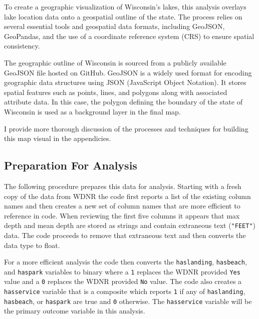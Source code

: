 \documentclass[
]{article}
\begin{document}
\begin{tcolorbox}[enhanced jigsaw, coltitle=black, toprule=.15mm, arc=.35mm, bottomtitle=1mm, opacityback=0, leftrule=.75mm, left=2mm, colframe=quarto-callout-note-color-frame, toptitle=1mm, titlerule=0mm, breakable, colbacktitle=quarto-callout-note-color!10!white, colback=white, bottomrule=.15mm, title=\textcolor{quarto-callout-note-color}{\faInfo}\hspace{0.5em}{Note}, rightrule=.15mm, opacitybacktitle=0.6]

To create a geographic visualization of Wisconsin's lakes, this analysis
overlays lake location data onto a geospatial outline of the state. The
process relies on several essential tools and geospatial data formats,
including GeoJSON, GeoPandas, and the use of a coordinate reference
system (CRS) to ensure spatial consistency.

The geographic outline of Wisconsin is sourced from a publicly available
GeoJSON file hosted on GitHub. GeoJSON is a widely used format for
encoding geographic data structures using JSON (JavaScript Object
Notation). It stores spatial features such as points, lines, and
polygons along with associated attribute data. In this case, the polygon
defining the boundary of the state of Wisconsin is used as a background
layer in the final map.

I provide more thorough discussion of the processes and techniques for
building this map visual in the appendicies.

\end{tcolorbox}

\subsection{Preparation For Analysis}\label{preparation-for-analysis}

The following procedure prepares this data for analysis. Starting with a
fresh copy of the data from WDNR the code first reports a list of the
existing column names and then creates a new set of column names that
are more efficient to reference in code. When reviewing the first five
columns it appears that max depth and mean depth are stored as strings
and contain extraneous text (\texttt{"FEET"}) data. The code proceeds to
remove that extraneous text and then converts the data type to float.

For a more efficient analysis the code then converts the
\texttt{haslanding}, \texttt{hasbeach}, and \texttt{haspark} variables
to binary where a \texttt{1} replaces the WDNR provided \texttt{Yes}
value and a \texttt{0} replaces the WDNR provided \texttt{No} value. The
code also creates a \texttt{hasservice} variable that is a composite
which reports \texttt{1} if any of \texttt{haslanding},
\texttt{hasbeach}, or \texttt{haspark} are true and \texttt{0}
otherwise. The \texttt{hasservice} variable will be the primary outcome
variable in this analysis.
\end{document}
